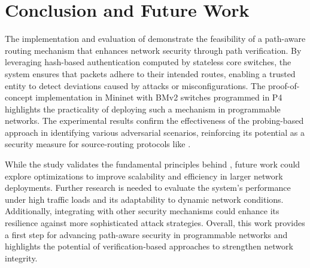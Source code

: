 \section{Conclusion and Future Work} \label{sec:conclusion}


The implementation and evaluation of \pathsec demonstrate the feasibility of a path-aware routing mechanism that enhances network security through path verification. By leveraging hash-based authentication computed by stateless core switches, the system ensures that packets adhere to their intended routes, enabling a trusted entity to detect deviations caused by attacks or misconfigurations. The proof-of-concept implementation in Mininet with BMv2 switches programmed in P4 highlights the practicality of deploying such a mechanism in programmable networks. The experimental results confirm the effectiveness of the probing-based approach in identifying various adversarial scenarios, reinforcing its potential as a security measure for source-routing protocols like \polka.  

While the study validates the fundamental principles behind \pathsec, future work could explore optimizations to improve scalability and efficiency in larger network deployments. Further research is needed to evaluate the system’s performance under high traffic loads and its adaptability to dynamic network conditions. Additionally, integrating \pathsec with other security mechanisms could enhance its resilience against more sophisticated attack strategies. Overall, this work provides a first step for advancing path-aware security in programmable networks and highlights the potential of verification-based approaches to strengthen network integrity.






